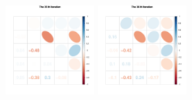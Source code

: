 \begin{figure}[h]
\includegraphics[width=0.3\textwidth,height=0.2\textheight]{Chapters/05MCMCOU/plots/paraEvolution/corMatrix35.pdf}
\includegraphics[width=0.3\textwidth,height=0.2\textheight]{Chapters/05MCMCOU/plots/paraEvolution/corMatrix36.pdf}
\end{figure}
